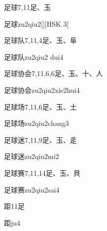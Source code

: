 \begin{Entry}{足球}{7,11}{⾜、⽟}
  \begin{Phonetics}{足球}{zu2qiu2}[][HSK 3]
  \end{Phonetics}
\end{Entry}

\begin{Entry}{足球队}{7,11,4}{⾜、⽟、⾩}
  \begin{Phonetics}{足球队}{zu2qiu2 dui4}
  \end{Phonetics}
\end{Entry}

\begin{Entry}{足球协会}{7,11,6,6}{⾜、⽟、⼗、⼈}
  \begin{Phonetics}{足球协会}{zu2qiu2xie2hui4}
  \end{Phonetics}
\end{Entry}

\begin{Entry}{足球场}{7,11,6}{⾜、⽟、⼟}
  \begin{Phonetics}{足球场}{zu2qiu2chang3}
  \end{Phonetics}
\end{Entry}

\begin{Entry}{足球迷}{7,11,9}{⾜、⽟、⾡}
  \begin{Phonetics}{足球迷}{zu2qiu2mi2}
  \end{Phonetics}
\end{Entry}

\begin{Entry}{足球赛}{7,11,14}{⾜、⽟、⾙}
  \begin{Phonetics}{足球赛}{zu2qiu2sai4}
  \end{Phonetics}
\end{Entry}

\begin{Entry}{距}{11}{⾜}
  \begin{Phonetics}{距}{ju4}
  \end{Phonetics}
\end{Entry}

